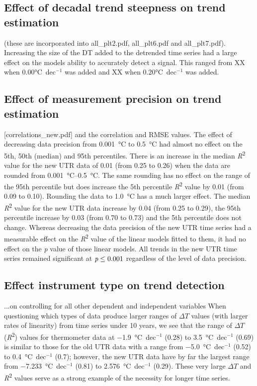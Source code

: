 \documentclass{ametsoc}
\begin{document}
\subsection{Effect of decadal trend steepness on trend estimation}
(these are incorporated into all_plt2.pdf, all_plt6.pdf and all_plt7.pdf).
Increasing the size of the DT added to the detrended time series had a large effect on the models ability to accurately detect a signal. This ranged from XX when 0.00\si{\degreeCelsius}~dec$^{-1}$ was added and XX when 0.20\si{\degreeCelsius}~dec$^{-1}$ was added.

\subsection{Effect of measurement precision on trend estimation}
[correlations_new.pdf] and the correlation and RMSE values.
The effect of decreasing data precision from \SI{0.001}{\degreeCelsius} to \SI{0.5}{\degreeCelsius} had almost no effect on the 5th, 50th (median) and 95th percentiles. There is an increase in the median \emph{R}\textsuperscript{2} value for the new UTR data of 0.01 (from 0.25 to 0.26) when the data are rounded from \SIrange{0.001}{0.5}{\degreeCelsius}. The same rounding has no effect on the range of the 95th percentile but does increase the 5th percentile \emph{R}\textsuperscript{2} value by 0.01 (from 0.09 to 0.10). Rounding the data to \SI{1.0}{\degreeCelsius} has a much larger effect. The median \emph{R}\textsuperscript{2} value for the new UTR data increase by 0.04 (from 0.25 to 0.29), the 95th percentile increase by 0.03 (from 0.70 to 0.73) and the 5th percentile does not change. Whereas decreasing the data precision of the new UTR time series had a measurable effect on the \emph{R}\textsuperscript{2} value of the linear models fitted to them, it had no effect on the \emph{p} value of those linear models. All trends in the new UTR time series remained significant at $\emph{p} \leq 0.001$ regardless of the level of data precision.

\subsection{Effect instrument type on trend detection}
...on controlling for all other dependent and independent variables
When questioning which types of data produce larger ranges of $\Delta T$ values (with larger rates of linearity) from time series under 10 years, we see that the range of $\Delta T$ (\emph{R}\textsuperscript{2}) values for thermometer data at \SI{-1.9}{\degreeCelsius}~dec$^{-1}$ (0.28) to \SI{3.5}{\degreeCelsius}~dec$^{-1}$ (0.69) is similar to those for the old UTR data with a range from \SI{-5.0}{\degreeCelsius}~dec$^{-1}$ (0.52) to \SI{0.4}{\degreeCelsius}~dec$^{-1}$ (0.7); however, the new UTR data have by far the largest range from \SI{-7.233}{\degreeCelsius}~dec$^{-1}$ (0.81) to \SI{2.576}{\degreeCelsius}~dec$^{-1}$ (0.29). These very large $\Delta T$ and \emph{R}\textsuperscript{2} values serve as a strong example of the necessity for longer time series.
\end{document}
